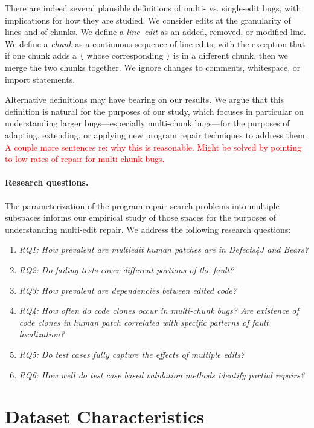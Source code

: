 \documentclass[sigconf, timestamp-false, anonymous=true]{acmart}
\newcommand\todo[1]{\textcolor{red}{#1}}
\begin{document}
There are indeed several plausible definitions of multi- vs. single-edit bugs,
with implications for how they are studied.  We consider edits at the granularity 
of lines and of chunks. We define a \emph{line~edit} as an added, removed, or modified 
line. We define a \emph{chunk} as a continuous sequence of line edits, with the exception 
that if one chunk adds a \texttt{\{} whose corresponding \texttt{\}} is in a different chunk, 
then we merge the two chunks together. 
We ignore changes to comments, whitespace, or import statements.

Alternative definitions may have bearing on our results.  We argue that this
definition is natural for the purposes of our study, which focuses in particular
on understanding larger bugs---especially multi-chunk bugs---for the purposes of 
adapting, extending, or applying new program repair techniques to address them. 
\todo{A couple more sentences re: why this is reasonable. Might be solved by 
pointing to low rates of repair for multi-chunk bugs.}

\paragraph{Research questions.}  The parameterization of the program repair
search problems into multiple subspaces informs our empirical study of those
spaces for the purposes of understanding multi-edit repair.  We address the
following research questions:

\begin{enumerate}
\item \emph{RQ1: How prevalent are multiedit human patches are in Defects4J and Bears?}
\item \emph{RQ2: Do failing tests cover different portions of the fault?}
\item \emph{RQ3: How prevalent are dependencies between edited code?}
\item \emph{RQ4: How often do code clones occur in multi-chunk bugs? Are existence of 
code clones in human patch correlated with specific patterns of fault localization?}
\item \emph{RQ5: Do test cases fully capture the effects of multiple edits?}
\item \emph{RQ6: How well do test case based validation methods identify partial repairs?}



\end{enumerate}

\section{Dataset Characteristics}
\label{sec:data-rq1}
\end{document}
